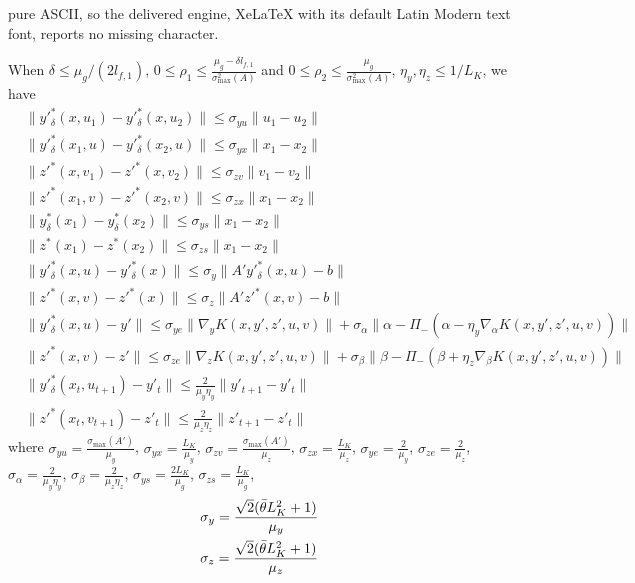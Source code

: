 \documentclass[10pt,a4paper]{amsart}
\begin{document}
pure ASCII, so the delivered engine, XeLaTeX with its default Latin Modern text font, reports no missing character.
\begin{lemma}\label{lemma: error bounds}
When $\delta\leq \mu_g/(2l_{f,1})$, $0\leq \rho_1\leq \frac{\mu_g-\delta l_{f,1}}{\sigma_{\max}^2(A)}$ and $0\leq \rho_2\leq \frac{\mu_g}{\sigma_{\max}^2(A)}$, $\eta_y, \eta_z\leq 1/L_K$, we have
    \begin{align}
        &\|y'^*_\delta(x,u_1)-y'^*_\delta(x,u_2)\|\leq \sigma_{yu}\|u_1-u_2\| \label{sigma yu}\\
        &\|y'^*_\delta(x_1,u)-y'^*_\delta(x_2, u)\|\leq \sigma_{yx}\|x_1-x_2\| \label{sigma yx}\\
        &\|z'^*(x,v_1)-z'^*(x, v_2)\|\leq \sigma_{zv}\|v_1-v_2\| \label{sigma zv}\\
        &\|z'^*(x_1,v)-z'^*(x_2, v)\|\leq \sigma_{zx}\|x_1-x_2\| \label{sigma zx}\\        &\|y^*_\delta(x_1)-y^*_\delta(x_2)\|\leq \sigma_{ys}\|x_1-x_2\|\label{sigma ys}\\
        &\|z^*(x_1)-z^*(x_2)\|\leq \sigma_{zs}\|x_1-x_2\| \label{sigma zs}\\
        &\|y'^*_\delta(x, u)-y'^*_\delta(x)\|\leq \sigma_y\|A'y'^*_\delta(x,u)-b\| \label{sigma y}\\
        &\|z'^*(x, v)-z'^*(x)\|\leq \sigma_z\|A'z'^*(x,v)-b\| \label{sigma z}\\
        &\|y'^*_\delta(x,u)-y'\|\leq \sigma_{ye}\|\nabla_y K(x, y', z', u, v)\|+\sigma_{\alpha}\|\alpha-\Pi_-(\alpha-\eta_y \nabla_\alpha K(x, y', z', u, v))\| \label{sigma ye}\\
        &\|z'^*(x,v)-z'\|\leq \sigma_{ze}\|\nabla_z K(x, y', z', u, v)\|+\sigma_{\beta}\|\beta-\Pi_-(\beta+\eta_z \nabla_\beta K(x, y', z', u, v))\| \label{sigma ze}\\
        &\|y'^*_\delta(x_t,u_{t+1})-y'_t\|\leq \frac{2}{\mu_y\eta_y}\|y'_{t+1}-y'_t\| \label{error bound yt}\\
        &\|z'^*(x_t,v_{t+1})-z'_t\|\leq \frac{2}{\mu_z\eta_z}\|z'_{t+1}-z'_t\|\label{error bound zt}
    \end{align}
where $\sigma_{yu}=\frac{\sigma_{\max}(A')}{\mu_y}$, $\sigma_{yx}=\frac{L_K}{\mu_y}$, $\sigma_{zv}=\frac{\sigma_{\max}(A')}{\mu_z}$, $\sigma_{zx}=\frac{L_K}{\mu_z}$, $\sigma_{ye}=\frac{2}{\mu_y}$, $\sigma_{ze}=\frac{2}{\mu_z}$, 
$\sigma_{\alpha}=\frac{2}{\mu_y\eta_y}$, $\sigma_{\beta}=\frac{2}{\mu_z\eta_z}$, $\sigma_{ys}=\frac{2L_K}{\mu_g}$, $\sigma_{zs}=\frac{L_K}{\mu_g}$, 
\begin{align*}
        &\sigma_y=\frac{\sqrt{2}(\Bar{\theta}L_K^2+1)}{\mu_y}\\
        &\sigma_z=\frac{\sqrt{2}(\Bar{\theta}L_K^2+1)}{\mu_z}
    \end{align*}



\end{lemma}
\end{document}
